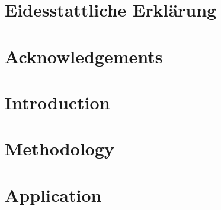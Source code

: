 \documentclass[a4paper,twoside,12pt,appendixprefix=true]{scrbook}
\begin{document}
\pagestyle{empty} %

\pagestyle{plain} %

\onehalfspacing    %


\chapter*{Eidesstattliche Erklärung}

\chapter*{Acknowledgements}

\tableofcontents %
\cleardoublepage %

\chapter{Introduction}
\label{sec:Introduction}


\chapter{Methodology}
\label{sec:Methodology}





\chapter{Application}
\label{sec:Application}







%
\end{document}
